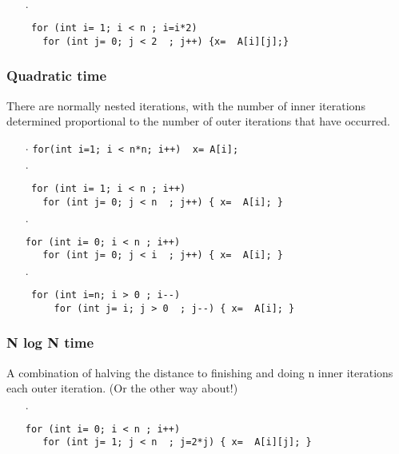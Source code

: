 \documentclass[twoside=false,DIV=14]{scrartcl}
\begin{document}
\begin{itemize}
\begin{itemize}
\item [$\cdot$] \begin{verbatim}
 for (int i= 1; i < n ; i=i*2) 
   for (int j= 0; j < 2  ; j++) {x=  A[i][j];} 
 \end{verbatim}
\end{itemize}

\subsubsection*{Quadratic time}

There are normally nested iterations, with the number of inner iterations determined proportional to the number of outer iterations that have occurred.

\begin{itemize}
\item [$\cdot$] {\tt for(int i=1; i < n*n; i++) { x= A[i]; }}

\item [$\cdot$] \begin{verbatim}
 for (int i= 1; i < n ; i++) 
   for (int j= 0; j < n  ; j++) { x=  A[i]; }
 \end{verbatim}

\item [$\cdot$] \begin{verbatim}
for (int i= 0; i < n ; i++) 
   for (int j= 0; j < i  ; j++) { x=  A[i]; }
 \end{verbatim}
 
\item [$\cdot$]\begin{verbatim}
 for (int i=n; i > 0 ; i--) 
     for (int j= i; j > 0  ; j--) { x=  A[i]; }
 \end{verbatim}
\end{itemize}

\subsubsection*{N log N time}

A combination of halving the distance to finishing and doing n inner iterations each outer iteration.  (Or the other way about!)


\begin{itemize}
\item [$\cdot$]\begin{verbatim}
for (int i= 0; i < n ; i++) 
   for (int j= 1; j < n  ; j=2*j) { x=  A[i][j]; }
 \end{verbatim}


\end{itemize}
\end{itemize}
\end{document}
